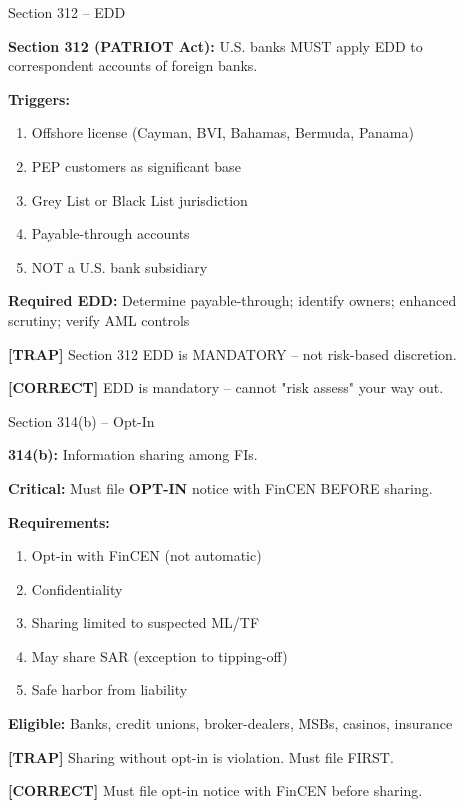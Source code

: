 \documentclass[8pt,aspectratio=169,fontsize=7pt]{beamer}
\renewcommand{\tiny}{\fontsize{4pt}{5pt}\selectfont}
\renewcommand{\normalsize}{\fontsize{8pt}{9pt}\selectfont}
\newcommand{\trap}[1]{%
	\begin{block}{\textcolor{redtrap}{\textbf{[TRAP]}}}
		\textcolor{redtrap}{\tiny #1}
	\end{block}
}
\newcommand{\correct}[1]{%
	\begin{block}{\textcolor{greencorrect}{\textbf{[CORRECT]}}}
		\textcolor{greencorrect}{\tiny #1}
	\end{block}
}
\begin{document}
	\begin{frame}{\normalsize Section 312 -- EDD}
		
		\textbf{Section 312 (PATRIOT Act):} U.S. banks MUST apply EDD to correspondent accounts of foreign banks.
		
		\textbf{Triggers:}
		\begin{enumerate}
			\item Offshore license (Cayman, BVI, Bahamas, Bermuda, Panama)
			\item PEP customers as significant base
			\item Grey List or Black List jurisdiction
			\item Payable-through accounts
			\item NOT a U.S. bank subsidiary
		\end{enumerate}
		
		\textbf{Required EDD:} Determine payable-through; identify owners; enhanced scrutiny; verify AML controls
		
		\trap{Section 312 EDD is MANDATORY -- not risk-based discretion.}
		
		\correct{EDD is mandatory -- cannot "risk assess" your way out.}
	\end{frame}
	
	\begin{frame}{\normalsize Section 314(b) -- Opt-In}
		
		\textbf{314(b):} Information sharing among FIs.
		
		\textbf{Critical:} Must file \textbf{OPT-IN} notice with FinCEN BEFORE sharing.
		
		\textbf{Requirements:}
		\begin{enumerate}
			\item Opt-in with FinCEN (not automatic)
			\item Confidentiality
			\item Sharing limited to suspected ML/TF
			\item May share SAR (exception to tipping-off)
			\item Safe harbor from liability
		\end{enumerate}
		
		\textbf{Eligible:} Banks, credit unions, broker-dealers, MSBs, casinos, insurance
		
		\trap{Sharing without opt-in is violation. Must file FIRST.}
		
		\correct{Must file opt-in notice with FinCEN before sharing.}
	\end{frame}
	
\end{document}
